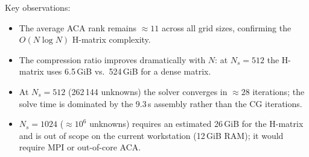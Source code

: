 \documentclass[11pt,a4paper]{article}
\begin{document}
\noindent
Key observations:
\begin{itemize}
  \item The average ACA rank remains $\approx 11$ across all grid sizes,
        confirming the $O(N\log N)$ H-matrix complexity.
  \item The compression ratio improves dramatically with $N$: at $N_s = 512$
        the H-matrix uses 6.5\,GiB vs.\ 524\,GiB for a dense matrix.
  \item At $N_s = 512$ (262\,144 unknowns) the solver converges in $\approx 28$
        iterations; the solve time is dominated by the 9.3\,s assembly rather
        than the CG iterations.
  \item $N_s = 1024$ ($\approx 10^6$ unknowns) requires an estimated 26\,GiB
        for the H-matrix and is out of scope on the current workstation (12\,GiB RAM);
        it would require MPI or out-of-core ACA.
\end{itemize}



\end{document}
